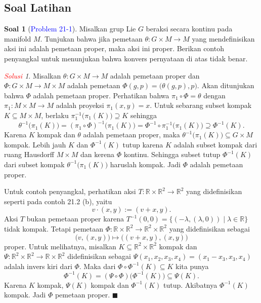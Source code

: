 \documentclass[11pt]{article}
\theoremstyle{definition}
\newtheorem*{problem}{Soal}
\theoremstyle{remark}
\newtheorem*{solution}{\textcolor{red}{Solusi}}
\newcommand{\er}{\mathbb{R}}            %
\begin{document}
\subsection{Soal Latihan}

\begin{problem}[\textcolor{blue}{Problem 21-1}]
Misalkan grup Lie $G$ beraksi secara kontinu pada manifold $M$. Tunjukan bahwa jika pemetaan $\theta : G \times M \to M$ yang mendefinisikan aksi ini adalah pemetaan proper, maka aksi ini proper. Berikan contoh penyangkal untuk menunjukan bahwa konvers pernyataan di atas tidak benar.    
\end{problem}
\begin{solution}
Misalkan $\theta : G \times M \to M$ adalah pemetaan proper dan $\Phi : G \times M \to M \times M$ adalah pemetaan $\Phi(g,p) = \big( \theta(g,p), p\big)$.  Akan ditunjukan bahwa $\Phi$ adalah pemetaan proper. Perhatikan bahwa $\pi_1 \circ \Phi  = \theta$ dengan $\pi_1 : M \times M \to M$ adalah proyeksi $\pi_1(x,y) = x$. Untuk sebarang subset kompak $K \subseteq M \times M$, berlaku $\pi_1^{-1} \big(\pi_1(K) \big) \supseteq K$ sehingga 
$$
\theta^{-1}\big(\pi_1(K)\big) = (\pi_1 \circ \Phi)^{-1}\big(\pi_1(K)\big)  = \Phi^{-1} \circ \pi_1^{-1}  \big( \pi_1 (K) \big) \supseteq \Phi^{-1}(K).
$$
Karena $K$ kompak dan $\theta$ adalah pemetaan proper, maka $\theta^{-1}\big(\pi_1(K)\big) \subseteq G \times M$ kompak. Lebih jauh $K$ dan $\Phi^{-1}(K)$ tutup karena $K$ adalah subset kompak dari ruang Hausdorff $M \times M$ dan kerena $\Phi$ kontinu. Sehingga subset tutup $\Phi^{-1}(K)$ dari subset kompak $\theta^{-1}\big(\pi_1(K)\big)$ haruslah kompak. Jadi $\Phi$ adalah pemetaan proper.

Untuk contoh penyangkal, perhatikan aksi $T : \er \times \er^2 \to \er^2$ yang didefinisikan seperti pada contoh 21.2 (b), yaitu
$$
v \cdot (x,y) := (v+x, y). 
$$
Aksi $T$ bukan pemetaan proper karena $T^{-1}(0,0) = \{(-\lambda,(\lambda,0) )  \mid \lambda \in \er \}$ tidak kompak. Tetapi pemetaan $\Phi : \er \times \er^2 \to \er^2 \times \er^2$ yang didefinisikan sebagai 
$$
\big(v,(x,y)\big) \mapsto \big((v+x,y),(x,y) \big)
$$ 
proper. Untuk melihatnya, misalkan $K \subseteq \er^2 \times \er^2$ kompak dan $\Psi : \er^2 \times \er^2 \to \er \times \er^2$ didefinisikan sebagai $\Psi(x_1,x_2,x_3,x_4)=(x_1-x_3,x_3,x_4)$ adalah invers kiri dari $\Phi$. Maka dari $\Phi \circ \Phi^{-1}(K)  \subseteq K$ kita punya
$$
\Phi^{-1}(K)=(\Psi \circ \Phi) \big( \Phi^{-1}(K)\big) \subseteq \Psi (K).
$$
Karena $K$ kompak, $\Psi(K)$ kompak dan $\Phi^{-1}(K)$ tutup. Akibatnya $\Phi^{-1}(K)$ kompak. Jadi $\Phi$ pemetaan proper. $\blacksquare$
\end{solution}
\end{document}
